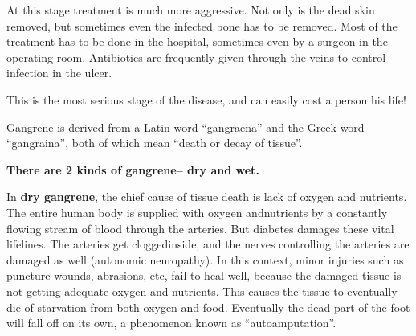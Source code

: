 At this stage treatment is much more aggressive. Not only is the dead skin removed, but sometimes even the infected bone has to be removed. Most of the treatment has to be done in the hospital, sometimes even by a surgeon in the operating room. Antibiotics are frequently given through the veins to control infection in the ulcer.


This is the most serious stage of the disease, and can easily cost a person his life!

Gangrene is derived from a Latin word “gangraena” and the Greek word “gangraina”, both of which mean “death or decay of tissue”.

\noindent\textbf{There are 2 kinds of gangrene– dry and wet.}

In \textbf{dry gangrene}, the chief cause of tissue death is lack of oxygen and nutrients. The entire human body is supplied with oxygen and\break nutrients by a constantly flowing stream of blood through the arte\-ries. But diabetes damages these vital lifelines. The arteries get clogged\break inside, and the nerves controlling the arteries are damaged as well (auto\-nomic neuropathy). In this context, minor injuries such as pun\-cture wounds, abrasions, etc, fail to heal well, because the damaged tissue is not getting adequate oxygen and nutrients. This causes the tissue to eve\-ntually die of starvation from both oxygen and food. Eventually the dead part of the foot will fall off on its own, a phenomenon known as “autoamputation”.

